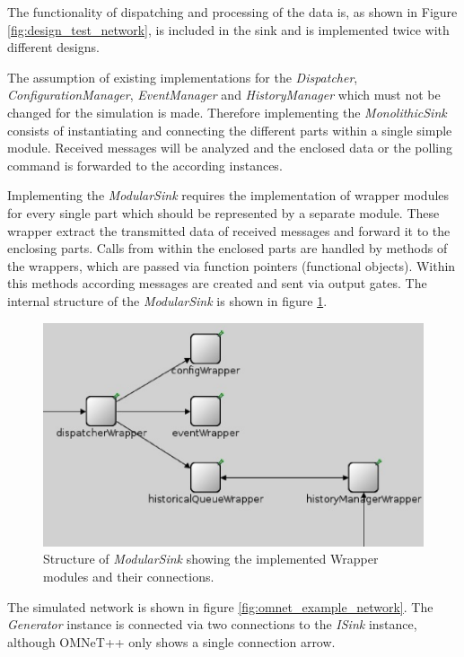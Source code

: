 The functionality of dispatching and processing of the data is, as shown in Figure \ref{fig:design_test_network}, is included in the sink and is implemented twice with different designs.

The assumption of existing implementations for the \emph{Dispatcher}, \emph{ConfigurationManager}, \emph{EventManager} and \emph{HistoryManager} which must not be changed for the simulation is made.
Therefore implementing the \emph{MonolithicSink} consists of instantiating and connecting the different parts within a single simple module.
Received messages will be analyzed and the enclosed data or the polling command is forwarded to the according instances.

Implementing the \emph{ModularSink} requires the implementation of wrapper modules for every single part which should be represented by a separate module.
These wrapper extract the transmitted data of received messages and forward it to the enclosing parts.
Calls from within the enclosed parts are handled by methods of the wrappers, which are passed via function pointers (functional objects).
Within this methods according messages are created and sent via output gates.
The internal structure of the \emph{ModularSink} is shown in figure \ref{fig:ModularSink}.

\begin{figure}
    \centering
    \includegraphics[width=0.9\linewidth]{images/ModularSink}
    \caption{Structure of \emph{ModularSink} showing the implemented Wrapper modules and their connections.}
    \label{fig:ModularSink}
\end{figure}

The simulated network is shown in figure \ref{fig:omnet_example_network}.
The \emph{Generator} instance is connected via two connections to the \emph{ISink} instance, although OMNeT++ only shows a single connection arrow.

